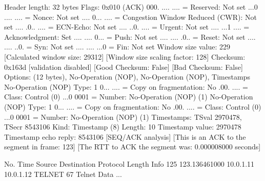     Header length: 32 bytes
    Flags: 0x010 (ACK)
        000. .... .... = Reserved: Not set
        ...0 .... .... = Nonce: Not set
        .... 0... .... = Congestion Window Reduced (CWR): Not set
        .... .0.. .... = ECN-Echo: Not set
        .... ..0. .... = Urgent: Not set
        .... ...1 .... = Acknowledgment: Set
        .... .... 0... = Push: Not set
        .... .... .0.. = Reset: Not set
        .... .... ..0. = Syn: Not set
        .... .... ...0 = Fin: Not set
    Window size value: 229
    [Calculated window size: 29312]
    [Window size scaling factor: 128]
    Checksum: 0x163d [validation disabled]
        [Good Checksum: False]
        [Bad Checksum: False]
    Options: (12 bytes), No-Operation (NOP), No-Operation (NOP), Timestamps
        No-Operation (NOP)
            Type: 1
                0... .... = Copy on fragmentation: No
                .00. .... = Class: Control (0)
                ...0 0001 = Number: No-Operation (NOP) (1)
        No-Operation (NOP)
            Type: 1
                0... .... = Copy on fragmentation: No
                .00. .... = Class: Control (0)
                ...0 0001 = Number: No-Operation (NOP) (1)
        Timestamps: TSval 2970478, TSecr 8543106
            Kind: Timestamp (8)
            Length: 10
            Timestamp value: 2970478
            Timestamp echo reply: 8543106
    [SEQ/ACK analysis]
        [This is an ACK to the segment in frame: 123]
        [The RTT to ACK the segment was: 0.000008000 seconds]

No.     Time           Source                Destination           Protocol Length Info
    125 123.136461000  10.0.1.11             10.0.1.12             TELNET   67     Telnet Data ...

